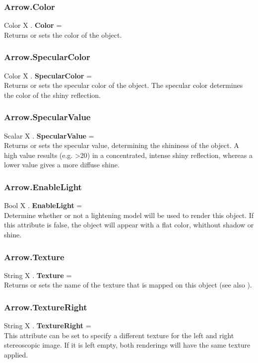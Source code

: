 \subsubsection{Arrow.Color \label{F:Arrow:Color}}
Color X . \textbf{Color} = \\
Returns or sets the color of the object.

\subsubsection{Arrow.SpecularColor \label{F:Arrow:SpecularColor}}
Color X . \textbf{SpecularColor} = \\
Returns or sets the specular color of the object. The specular color determines the color of the shiny reflection.

\subsubsection{Arrow.SpecularValue \label{F:Arrow:SpecularValue}}
Scalar X . \textbf{SpecularValue} = \\
Returns or sets the specular value, determining the shininess of the object. A high value results (e.g. >20) in a concentrated, intense shiny reflection, whereas a lower value gives a more diffuse shine.

\subsubsection{Arrow.EnableLight \label{F:Arrow:EnableLight}}
Bool X . \textbf{EnableLight} = \\
Determine whether or not a lightening model will be used to render this object. If this attribute is false, the object will appear with a flat color, whithout shadow or shine.

\subsubsection{Arrow.Texture \label{F:Arrow:Texture}}
String X . \textbf{Texture} = \\
Returns or sets the name of the texture that is mapped on this object (see also ).

\subsubsection{Arrow.TextureRight \label{F:Arrow:TextureRight}}
String X . \textbf{TextureRight} = \\
This attribute can be set to specify a different texture for the left and right stereoscopic image. If it is left empty, both renderings will have the same texture applied.

